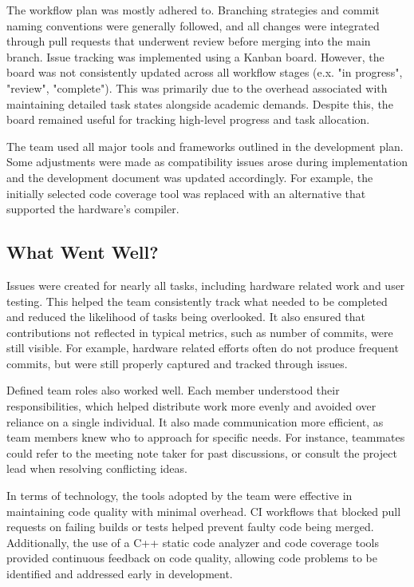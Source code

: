 \documentclass{article}
\begin{document}
The workflow plan was mostly adhered to. Branching strategies and commit naming
conventions were generally followed, and all changes were integrated through
pull requests that underwent review before merging into the main branch.
Issue tracking was implemented using a Kanban board. However, the board was not
consistently updated across all workflow stages (e.x. "in progress", "review",
"complete"). This was primarily due to the overhead associated with maintaining
detailed task states alongside academic demands. Despite this, the board
remained useful for tracking high-level progress and task allocation.

The team used all major tools and frameworks outlined in the development plan.
Some adjustments were made as compatibility issues arose during implementation
and the development document was updated accordingly. For example, the
initially selected code coverage tool was replaced with an alternative that
supported the hardware's compiler.

\subsection{What Went Well?}

Issues were created for nearly all tasks, including hardware related work and
user testing. This helped the team consistently track what needed to be
completed and reduced the likelihood of tasks being overlooked. It also ensured
that contributions not reflected in typical metrics, such as number of commits,
were still visible. For example, hardware related efforts often do not produce
frequent commits, but were still properly captured and tracked through issues.

Defined team roles also worked well. Each member understood their
responsibilities, which helped distribute work more evenly and avoided over
reliance on a single individual. It also made communication more efficient,
as team members knew who to approach for specific needs. For instance,
teammates could refer to the meeting note taker for past discussions, or
consult the project lead when resolving conflicting ideas.

In terms of technology, the tools adopted by the team were effective in
maintaining code quality with minimal overhead. CI workflows that blocked pull
requests on failing builds or tests helped prevent faulty code being merged.
Additionally, the use of a C++ static code analyzer and code coverage tools
provided continuous feedback on code quality, allowing code problems to be
identified and addressed early in development.
\end{document}

